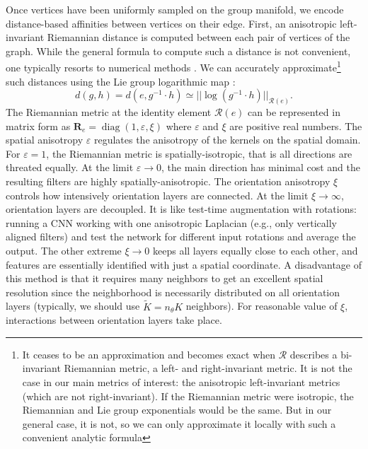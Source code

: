 \documentclass{article}
\DeclareMathOperator{\diag}{diag}
\begin{document}
Once vertices have been uniformly sampled on the group manifold, we encode distance-based affinities between vertices on their edge. First, an anisotropic left-invariant Riemannian distance is computed between each pair of vertices of the graph. While the general formula to compute such a distance is not convenient, one typically resorts to numerical methods \citep{sanguinetti2015fastmarching}. We can accurately approximate\footnote{It ceases to be an approximation and becomes exact when $\mathcal{R}$ describes a bi-invariant Riemannian metric, a left- and right-invariant metric. It is not the case in our main metrics of interest: the anisotropic left-invariant metrics (which are not right-invariant). If the Riemannian metric were isotropic, the Riemannian and Lie group exponentials would be the same. But in our general case, it is not, so we can only approximate it locally with such a convenient analytic formula} such distances using the Lie group logarithmic map \citep{bekkers2018nilpotent}:
\begin{equation}
d(g, h) = d(e, g^{-1} \cdot h) \simeq ||\log (g^{-1} \cdot h)||_{\mathcal{R}(e)}.
\end{equation}
The Riemannian metric at the identity element $\mathcal{R}(e)$ can be represented in matrix form as $\boldsymbol{R}_e = \diag (1, \varepsilon, \xi)$ where $\varepsilon$ and $\xi$ are positive real numbers. The spatial anisotropy $\varepsilon$ regulates the anisotropy of the kernels on the spatial domain. For $\varepsilon = 1$, the Riemannian metric is spatially-isotropic, that is all directions are threated equally. At the limit $\varepsilon \to 0$, the main direction has minimal cost and the resulting filters are highly spatially-anisotropic. The orientation anisotropy $\xi$ controls how intensively orientation layers are connected. At the limit $\xi \to \infty$, orientation layers are decoupled. It is like test-time augmentation with rotations: running a CNN working with one anisotropic Laplacian (e.g., only vertically aligned filters) and test the network for different input rotations and average the output. The other extreme $\xi \to 0$ keeps all layers equally close to each other, and features are essentially identified with just a spatial coordinate. A disadvantage of this method is that it requires many neighbors to get an excellent spatial resolution since the neighborhood is necessarily distributed on all orientation layers (typically, we should use $\tilde{K} = n_\theta K$ neighbors). For reasonable value of $\xi$, interactions between orientation layers take place. 
\end{document}
